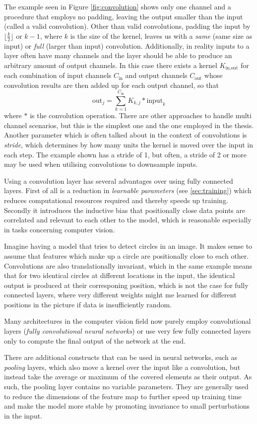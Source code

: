 The example seen in Figure \ref*{fig:convolution} shows only one channel and a procedure that employs no padding, leaving the output smaller than the input (called a valid convolution). Other than valid convolutions, padding the input by $\lfloor\frac{k}{2}\rfloor$ or $k - 1$, where $k$ is the size of the kernel, leaves us with a \emph{same} (same size as input) or \emph{full} (larger than input) convolution. Additionally, in reality inputs to a layer often have many channels and the layer should be able to produce an arbitrary amount of output channels. In this case there exists a kernel $K_{\text{in}, \text{out}}$ for each combination of input channels $C_\text{in}$ and output channels $C_{\text{out}}$ whose convolution results are then added up for each output channel, so that
$$
    \text{out}_j = \sum_{k=1}^{C_\text{in}} K_{k,j} * \text{input}_k
$$
where $*$ is the convolution operation. There are other approaches to handle multi channel scenarios, but this is the simplest one and the one employed in the thesis.
Another parameter which is often talked about in the context of convolutions is \emph{stride}, which determines by how many units the kernel is moved over the input in each step. The example shown has a stride of 1, but often, a stride of 2 or more may be used when utilising convolutions to downsample inputs.

Using a convolution layer has several advantages over using fully connected layers. First of all is a reduction in \emph{learnable parameters} (see \ref*{sec:training}) which reduces computational resources required and thereby speeds up training. Secondly it introduces the inductive bias that positionally close data points are correlated and relevant to each other to the model, which is reasonable especially in tasks concerning computer vision. 

Imagine having a model that tries to detect circles in an image. It makes sense to assume that features which make up a circle are positionally close to each other. Convolutions are also translationally invariant, which in the same example means that for two identical circles at different locations in the input, the identical output is produced at their corresponing position, which is not the case for fully connected layers, where very different weights might me learned for different positions in the picture if data is insufficiently random.

Many architectures in the computer vision field now purely employ convolutional layers (\emph{fully convolutional neural networks}) or use very few fully connected layers only to compute the final output of the network at the end. 

There are additional constructs that can be used in neural networks, such as \emph{pooling} layers, which also move a kernel over the input like a convolution, but instead take the average or maximum of the covered elements as their output. As such, the pooling layer contains no variable parameters. They are generally used to reduce the dimensions of the feature map to further speed up training time and make the model more stable by promoting invariance to small perturbations in the input.